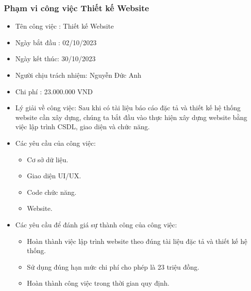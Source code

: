 \documentclass[12pt]{article}
\begin{document}
\subsubsection{Phạm vi công việc Thiết kế Website}
\begin{itemize}[label=-, leftmargin=1cm]
    \item Tên công việc : Thiết kế Website
    \item Ngày bắt đầu : 02/10/2023
    \item Ngày kết thúc: 30/10/2023
    \item Người chịu trách nhiệm: Nguyễn Đức Anh
    \item Chi phí : 23.000.000 VND
    \item  Lý giải về công việc: Sau khi có tài liệu báo cáo đặc tả và thiết kế hệ thống website cần xây dựng, chúng ta bắt đầu vào thực hiện xây dựng website bằng việc lập trình CSDL, giao diện và chức năng.
    \item Các yêu cầu của công việc:
    \begin{itemize}[label=+, leftmargin=1cm]
        \item Cơ sở dữ liệu.
        \item Giao diện UI/UX.
        \item Code chức năng.
        \item Website.
    \end{itemize}
    \item Các yêu cầu để đánh giá sự thành công của công việc:
    \begin{itemize}[label=+, leftmargin=1cm]
        \item Hoàn thành việc lập trình website theo đúng tài liệu đặc tả và thiết kế hệ thống.
        \item Sử dụng đúng hạn mức chi phí cho phép là 23 triệu đồng.
        \item Hoàn thành công việc trong thời gian quy định.
    \end{itemize}
\end{itemize}
\end{document}
